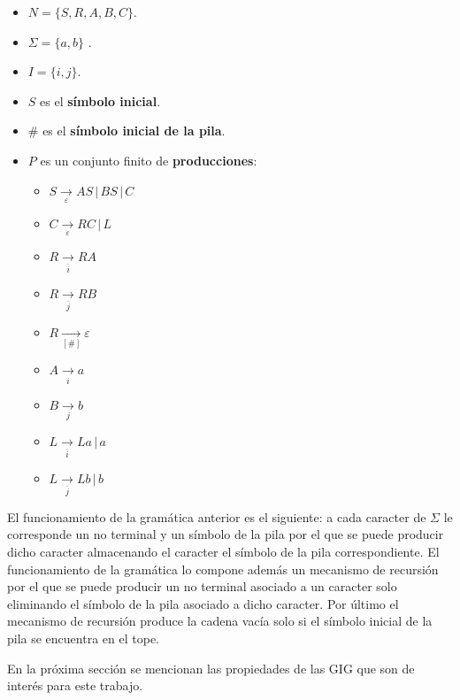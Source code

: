 \begin{itemize}
      \item $N= \{S,R,A,B,C\}$.
      \item \( \Sigma=\{a,b\} \) .
      \item $I=\{i,j\}$.
      \item $S$ es el \textbf{símbolo inicial}.
      \item $\#$ es el \textbf{símbolo inicial de la pila}.
      \item $P$ es un conjunto finito de \textbf{producciones}:
            \begin{multicols}{2}
                  \begin{itemize}
                        \item $S\underset{\varepsilon}{\to} AS\,|\,BS\,|\,C$
                        \item $C\underset{\varepsilon}{\to} RC\,|\,L$
                        \item $R\underset{\overline{i}}{\to} RA$
                        \item $R\underset{\overline{j}}{\to} RB$
                        \item $R\underset{[\#]}{\to} \varepsilon$
                        \item $A\underset{i}{\to} a$
                        \item $B\underset{j}{\to} b$
                        \item $L\underset{\overline{i}}{\to} La\,|\,a$
                        \item $L\underset{\overline{j}}{\to} Lb\,|\,b$
                  \end{itemize}
            \end{multicols}
\end{itemize}

El funcionamiento de la gramática anterior es el siguiente: a cada caracter de $\Sigma$ le corresponde un no
terminal y un símbolo de la pila por el que se puede producir dicho caracter almacenando el caracter el símbolo
de la pila correspondiente. El funcionamiento de la gramática lo compone además un mecanismo de recursión por el
que se puede producir un no terminal asociado a un caracter solo eliminando el símbolo de la pila asociado a
dicho caracter. Por último el mecanismo de recursión produce la cadena vacía solo si el símbolo inicial de la
pila se encuentra en el tope.

En la próxima sección se mencionan las propiedades de las GIG que son de interés para este trabajo.
